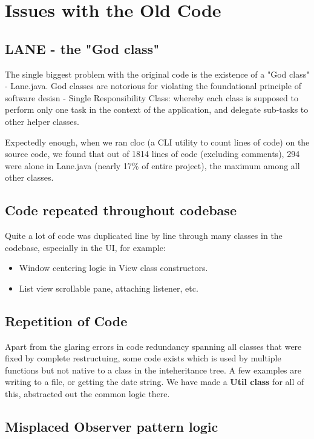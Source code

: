\section{Issues with the Old Code}

\subsection{LANE - the "God class"}

The single biggest problem with the original code is the existence of a "God class" - Lane.java. God classes are notorious for violating the foundational principle of software desisn - Single Responsibility Class: whereby each class is supposed to perform only one task in the context of the application, and delegate sub-tasks to other helper classes.

Expectedly enough, when we ran \textrm{cloc} (a CLI utility to count lines of code) on the source code, we found that out of 1814 lines of code (excluding comments), 294 were alone in Lane.java (nearly 17\% of entire project), the maximum among all other classes.

\subsection{Code repeated throughout codebase}

Quite a lot of code was duplicated line by line through many classes in the codebase, especially in the UI, for example:

\begin{itemize}
\item Window centering logic in View class constructors.
\item List view scrollable pane, attaching listener, etc.
\end{itemize}

\subsection{Repetition of Code}

Apart from the glaring errors in code redundancy spanning all classes that were fixed by complete restructuing, some code exists which is used by multiple functions but not native to a class in the inteheritance tree. A few examples are writing to a file, or getting the date string. We have made a \textbf{Util class} for all of this, abstracted out the common logic there.

\subsection{Misplaced Observer pattern logic}

